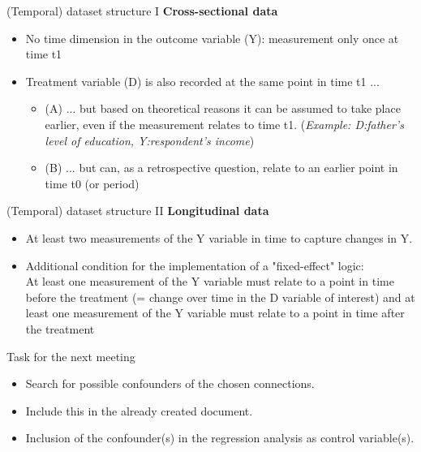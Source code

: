 \documentclass{beamer}\usepackage[]{graphicx}\usepackage[]{xcolor}
\begin{document}
\begin{frame}{(Temporal) dataset structure I}
\textbf{Cross-sectional data}
  \begin{itemize}
    \item No time dimension in the outcome variable (Y): measurement only once at time t1
    \item Treatment variable (D) is also recorded at the same point in time t1 ... \\[0.5em]
      \begin{itemize}  
        \item (A) ... but based on theoretical reasons it can be assumed to take place earlier, even if the measurement relates to time t1. (\textit{Example: D:father's level of education, Y:respondent's income}) \\[0.5em]
        \item (B) ... but can, as a retrospective question, relate to an earlier point in time t0 (or period)
      \end{itemize}
  \end{itemize}
\end{frame}


\begin{frame}{(Temporal) dataset structure II}
\textbf{Longitudinal data}
  \begin{itemize}
    \item At least two measurements of the Y variable in time to capture changes in Y.
    \item Additional condition for the implementation of a "fixed-effect" logic: \\
    At least one measurement of the Y variable must relate to a point in time before the treatment (= change over time in the D variable of interest) and at least one measurement of the Y variable must relate to a point in time after the treatment
  \end{itemize}
\end{frame}



\begin{frame}{Task for the next meeting}
\begin{itemize}
  \item Search for possible confounders of the chosen connections. \\[1em]
  \item Include this in the already created document. \\[1em]
  \item Inclusion of the confounder(s) in the regression analysis as control variable(s). \\[1em]
\end{itemize}
\end{frame} 



\begin{frame}

  
\end{frame} 
\end{document}
